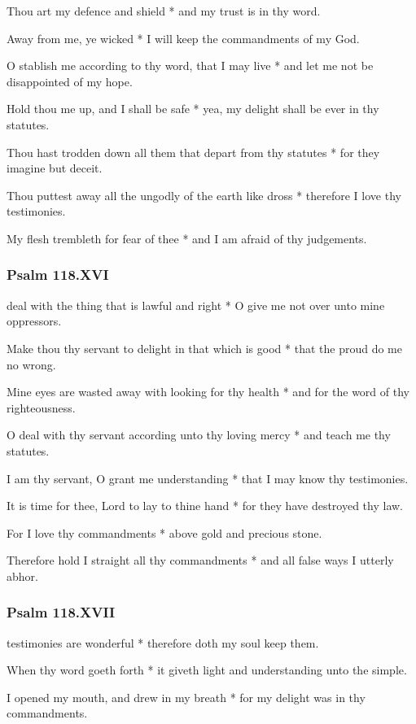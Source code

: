 Thou art my defence and shield * and my trust is in thy word.

Away from me, ye wicked * I will keep the commandments of my God.

O stablish me according to thy word, that I may live * and let me not be disappointed of my hope.

Hold thou me up, and I shall be safe * yea, my delight shall be ever in thy statutes.

Thou hast trodden down all them that depart from thy statutes * for they imagine but deceit.

Thou puttest away all the ungodly of the earth like dross * therefore I love thy testimonies.

My flesh trembleth for fear of thee * and I am afraid of thy judgements.

\subsubsection{Psalm 118.XVI}

 deal with the thing that is lawful and right * O give me not over unto mine oppressors.

Make thou thy servant to delight in that which is good * that the proud do me no wrong.

Mine eyes are wasted away with looking for thy health * and for the word of thy righteousness.

O deal with thy servant according unto thy loving mercy * and teach me thy statutes.

I am thy servant, O grant me understanding * that I may know thy testimonies.

It is time for thee, Lord to lay to thine hand * for they have destroyed thy law.

For I love thy commandments * above gold and precious stone.

Therefore hold I straight all thy commandments * and all false ways I utterly abhor.

\subsubsection{Psalm 118.XVII}

 testimonies are wonderful * therefore doth my soul keep them.

When thy word goeth forth * it giveth light and understanding unto the simple.

I opened my mouth, and drew in my breath * for my delight was in thy commandments.

